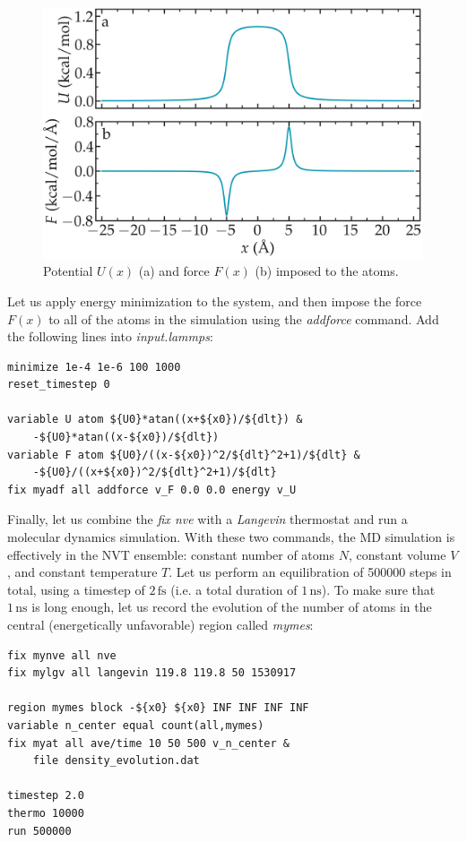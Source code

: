 \documentclass[9pt,tutorial]{livecoms}
\begin{document}
\begin{figure}
\centering
\includegraphics[width=\linewidth]{US-potential}
\caption{Potential $U (x)$ (a) and force $F (x)$ (b) imposed to the atoms.}
\label{fig:potential}
\end{figure}

Let us apply energy minimization to the system, and then impose the force $F(x)$ to all of the atoms in the simulation using the \textit{addforce} command. Add the following lines into \textit{input.lammps}:
{\normalsize \begin{verbatim}
minimize 1e-4 1e-6 100 1000
reset_timestep 0

variable U atom ${U0}*atan((x+${x0})/${dlt}) &
    -${U0}*atan((x-${x0})/${dlt})
variable F atom ${U0}/((x-${x0})^2/${dlt}^2+1)/${dlt} &
    -${U0}/((x+${x0})^2/${dlt}^2+1)/${dlt}
fix myadf all addforce v_F 0.0 0.0 energy v_U
\end{verbatim}}
Finally, let us combine the \textit{fix nve} with a \textit{Langevin} thermostat and run a molecular dynamics simulation. With these two commands, the MD simulation is effectively in the NVT ensemble: constant number of atoms $N$, constant volume $V$, and constant temperature $T$. Let us perform an equilibration of 500000 steps in total, using a timestep of $2\,\text{fs}$ (i.e. a total duration of $1\,\text{ns}$). To make sure that $1\,\text{ns}$ is long enough, let us record the evolution of the number of atoms in the central (energetically unfavorable) region called \textit{mymes}:
{\normalsize \begin{verbatim}
fix mynve all nve
fix mylgv all langevin 119.8 119.8 50 1530917

region mymes block -${x0} ${x0} INF INF INF INF 
variable n_center equal count(all,mymes)
fix myat all ave/time 10 50 500 v_n_center &
    file density_evolution.dat

timestep 2.0
thermo 10000
run 500000
\end{verbatim}}
\end{document}
